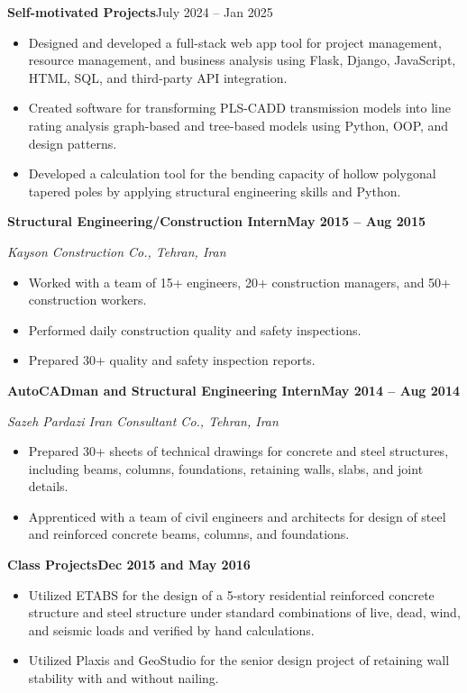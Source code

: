 \documentclass[10pt, letterpaper]{article}
\newcommand{\jobline}[2]{%
  \vspace{5pt}%
  \noindent\textbf{#1}\hfill\textbf{#2}\par%
  \vspace{1pt}%
}
\newcommand{\subline}[1]{%
  \vspace{-1pt}%
  \noindent\textit{#1}\par%
  \vspace{1pt}%
}
\newenvironment{rlist}{%
  \begin{itemize}[leftmargin=1.4em, itemsep=1pt, topsep=2pt, parsep=0pt]%
}{%
  \end{itemize}%
}
\begin{document}
\vspace{6pt}
\noindent\textbf{Self-motivated Projects}\hfill July 2024 -- Jan 2025
\begin{rlist}
  \item Designed and developed a full-stack web app tool for project management, resource management, and business analysis using Flask, Django, JavaScript, HTML, SQL, and third-party API integration.
  \item Created software for transforming PLS-CADD transmission models into line rating analysis graph-based and tree-based models using Python, OOP, and design patterns.
  \item Developed a calculation tool for the bending capacity of hollow polygonal tapered poles by applying structural engineering skills and Python.
\end{rlist}

\vspace{6pt}
\jobline{Structural Engineering/Construction Intern}{May 2015 -- Aug 2015}
\subline{Kayson Construction Co., Tehran, Iran}
\begin{rlist}
  \item Worked with a team of 15+ engineers, 20+ construction managers, and 50+ construction workers.
  \item Performed daily construction quality and safety inspections.
  \item Prepared 30+ quality and safety inspection reports.
\end{rlist}

\jobline{AutoCADman and Structural Engineering Intern}{May 2014 -- Aug 2014}
\subline{Sazeh Pardazi Iran Consultant Co., Tehran, Iran}
\begin{rlist}
  \item Prepared 30+ sheets of technical drawings for concrete and steel structures, including beams, columns, foundations, retaining walls, slabs, and joint details.
  \item Apprenticed with a team of civil engineers and architects for design of steel and reinforced concrete beams, columns, and foundations.
\end{rlist}

\jobline{Class Projects}{Dec 2015 and May 2016}
\begin{rlist}
  \item Utilized ETABS for the design of a 5-story residential reinforced concrete structure and steel structure under standard combinations of live, dead, wind, and seismic loads and verified by hand calculations.
  \item Utilized Plaxis and GeoStudio for the senior design project of retaining wall stability with and without nailing.
\end{rlist}
\end{document}
